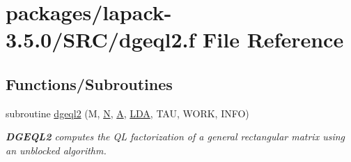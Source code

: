\hypertarget{dgeql2_8f}{}\section{packages/lapack-\/3.5.0/\+S\+R\+C/dgeql2.f File Reference}
\label{dgeql2_8f}
\subsection*{Functions/\+Subroutines}
\begin{DoxyCompactItemize}
\item 
subroutine \hyperlink{group__doubleGEcomputational_gaa3c49765445900907515a341da534d19}{dgeql2} (M, \hyperlink{polmisc_8c_a0240ac851181b84ac374872dc5434ee4}{N}, \hyperlink{classA}{A}, \hyperlink{example__user_8c_ae946da542ce0db94dced19b2ecefd1aa}{L\+D\+A}, T\+A\+U, W\+O\+R\+K, I\+N\+F\+O)
\begin{DoxyCompactList}\small\item\em {\bfseries D\+G\+E\+Q\+L2} computes the Q\+L factorization of a general rectangular matrix using an unblocked algorithm. \end{DoxyCompactList}\end{DoxyCompactItemize}
